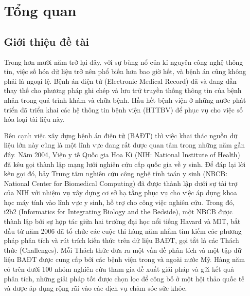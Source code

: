 \chapter{Tổng quan}
\section{Giới thiệu đề tài}\label{gioithieudetai}
Trong hơn mười năm trở lại đây, với sự bùng nổ của kỉ nguyên công nghệ thông tin, việc số hóa dữ liệu trở nên phổ biến hơn bao giờ hết, và bệnh án cũng không phải là ngoại lệ. Bệnh án điện tử (Electronic Medical Record) đã và đang dần thay thế cho phương pháp ghi chép và lưu trữ truyền thống thông tin của bệnh nhân trong quá trình khám và chữa bệnh. Hầu hết bệnh viện ở những nước phát triển đã triển khai các hệ thông tin bệnh viện (HTTBV) để phục vụ cho việc số hóa loại tài liệu này.

Bên cạnh việc xây dựng bệnh án điện tử (BAĐT) thì việc khai thác nguồn dữ liệu lớn này cũng là một lĩnh vực đang rất được quan tâm trong những năm gần đây. Năm 2004, Viện y tế Quốc gia Hoa Kì (NIH: National Institute of Health) đã kêu gọi thành lập mạng lưới nghiên cứu cấp quốc gia về y sinh. Để đáp lại lời kêu gọi đó, bảy Trung tâm nghiên cứu công nghệ tính toán y sinh (NBCB: National Center for Biomedical Computing) đã được thành lập dưới sự tài trợ của NIH với nhiệm vụ xây dựng cơ sở hạ tầng phục vụ cho việc áp dụng khoa học máy tính vào lĩnh vực y sinh, hỗ trợ cho công việc nghiên cứu. Trong đó, i2b2 (Informatics for Integrating Biology and the Bedside), một NBCB được thành lập bởi sự hợp tác giữa hai trường đại học nổi tiếng Havard và MIT, bắt đầu từ năm 2006 đã tổ chức các cuộc thi hàng năm nhằm tìm kiếm các phương pháp phân tích và rút trích kiến thức trên dữ liệu BAĐT, gọi tắt là các Thách thức (Challenges). Mỗi Thách thức đưa ra một vấn đề phân tích và một tập dữ liệu BAĐT được cung cấp bởi các bệnh viện trong và ngoài nước Mỹ. Hàng năm có trên dưới 100 nhóm nghiên cứu tham gia đề xuất giải pháp và gửi kết quả phân tích, những giải pháp tốt được chọn lọc để công bố ở một hội thảo quốc tế và được áp dụng rộng rãi vào các dịch vụ chăm sóc sức khỏe.


